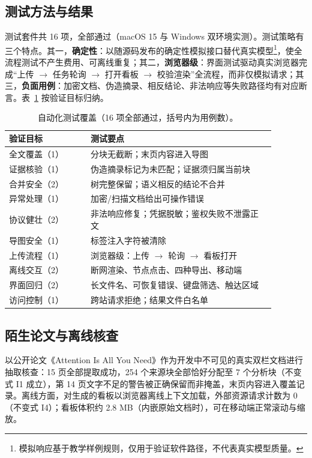 \documentclass[11pt]{article}
\begin{document}
\subsection{测试方法与结果}

测试套件共 16 项，全部通过（macOS 15 与 Windows 双环境实测）。测试策略有三个特点。其一，\textbf{确定性}：以随源码发布的确定性模拟接口替代真实模型\footnote{模拟响应基于教学样例规则，仅用于验证软件路径，不代表真实模型质量。}，使全流程测试不产生费用、可离线重复；其二，\textbf{浏览器级}：界面测试驱动真实浏览器完成“上传 $\rightarrow$ 任务轮询 $\rightarrow$ 打开看板 $\rightarrow$ 校验渲染”全流程，而非仅模拟请求；其三，\textbf{负面用例}：加密文档、伪造摘录、相反结论、非法响应等失败路径均有对应断言。表~\ref{tab:tests} 按验证目标归纳。

\begin{table}[t]
\centering
\small
\begin{tabular}{@{}p{0.27\linewidth}p{0.61\linewidth}@{}}
\toprule
\textbf{验证目标} & \textbf{测试要点} \\
\midrule
全文覆盖（1） & 分块无截断；末页内容进入导图 \\
证据核验（1） & 伪造摘录标记为未匹配；证据须归属当前块 \\
合并安全（2） & 树完整保留；语义相反的结论不合并 \\
异常处理（1） & 加密/扫描文档给出可操作错误 \\
协议健壮（2） & 非法响应修复；凭据脱敏；鉴权失败不泄露正文 \\
导图安全（1） & 标签注入字符被清除 \\
上传流程（1） & 浏览器级：上传 $\rightarrow$ 轮询 $\rightarrow$ 看板打开 \\
离线交互（2） & 断网渲染、节点点击、四种导出、移动端 \\
界面回归（2） & 长文件名、可恢复错误、键盘筛选、触达区域 \\
访问控制（1） & 跨站请求拒绝；结果文件白名单 \\
\bottomrule
\end{tabular}
\caption{自动化测试覆盖（16 项全部通过，括号内为用例数）。}
\label{tab:tests}
\end{table}

\subsection{陌生论文与离线核查}

以公开论文《Attention Is All You Need》作为开发中不可见的真实双栏文档进行抽取核查：15 页全部提取成功，254 个来源块全部恰好分配至 7 个分析块（不变式 I1 成立），第 14 页文字不足的警告被正确保留而非掩盖，末页内容进入覆盖记录。离线方面，对生成的看板以浏览器离线上下文加载，外部资源请求计数为 0（不变式 I4）；看板体积约 2.8 MB（内嵌原始文档时），可在移动端正常滚动与缩放。
\end{document}
